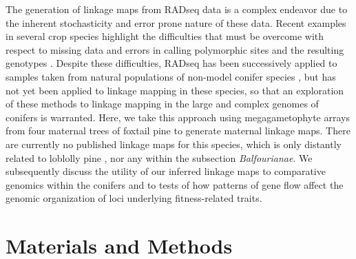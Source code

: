 \documentclass[11pt]{article}
\begin{document}
The generation of linkage maps from RADseq data is a complex endeavor due to the inherent stochasticity
and error prone nature of these data. Recent examples in several crop species highlight the
difficulties that must be overcome with respect to missing data and errors in calling polymorphic sites 
and the resulting genotypes \citep{Pfender:2011, Ward:2013}. Despite these difficulties, RADseq has been 
successively applied to samples taken from natural populations of non-model conifer species \citep{Parchman:2012}, but has not yet 
been applied to linkage mapping in these species, so that an exploration of these methods to linkage mapping in the large and complex 
genomes of conifers is warranted. Here, we take this approach using megagametophyte arrays from four maternal trees of foxtail pine
to generate maternal linkage maps. There are currently no published linkage 
maps for this species, which is only distantly related to loblolly pine \citep{Eckert:2006a}, nor any within the subsection \textit{Balfourianae}. 
We subsequently discuss the utility of our inferred linkage maps to comparative genomics 
within the conifers and to tests of how patterns of gene flow affect the genomic organization of loci underlying fitness-related traits.


\section*{Materials and Methods}\label{ss:mats}
\end{document}
